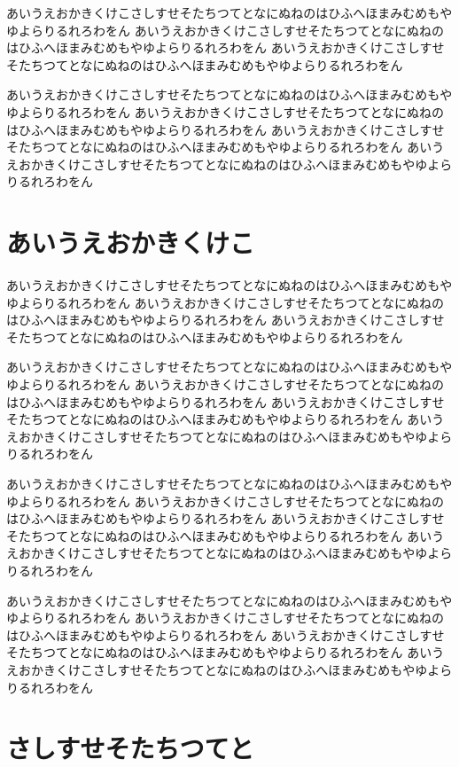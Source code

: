 \documentclass{jspf}            %
\begin{document}
あいうえおかきくけこさしすせそたちつてとなにぬねのはひふへほまみむめもやゆよらりるれろわをん
あいうえおかきくけこさしすせそたちつてとなにぬねのはひふへほまみむめもやゆよらりるれろわをん
あいうえおかきくけこさしすせそたちつてとなにぬねのはひふへほまみむめもやゆよらりるれろわをん

あいうえおかきくけこさしすせそたちつてとなにぬねのはひふへほまみむめもやゆよらりるれろわをん
あいうえおかきくけこさしすせそたちつてとなにぬねのはひふへほまみむめもやゆよらりるれろわをん
あいうえおかきくけこさしすせそたちつてとなにぬねのはひふへほまみむめもやゆよらりるれろわをん
あいうえおかきくけこさしすせそたちつてとなにぬねのはひふへほまみむめもやゆよらりるれろわをん

\section{あいうえおかきくけこ}

あいうえおかきくけこさしすせそたちつてとなにぬねのはひふへほまみむめもやゆよらりるれろわをん
あいうえおかきくけこさしすせそたちつてとなにぬねのはひふへほまみむめもやゆよらりるれろわをん
あいうえおかきくけこさしすせそたちつてとなにぬねのはひふへほまみむめもやゆよらりるれろわをん

あいうえおかきくけこさしすせそたちつてとなにぬねのはひふへほまみむめもやゆよらりるれろわをん
あいうえおかきくけこさしすせそたちつてとなにぬねのはひふへほまみむめもやゆよらりるれろわをん
あいうえおかきくけこさしすせそたちつてとなにぬねのはひふへほまみむめもやゆよらりるれろわをん
あいうえおかきくけこさしすせそたちつてとなにぬねのはひふへほまみむめもやゆよらりるれろわをん

あいうえおかきくけこさしすせそたちつてとなにぬねのはひふへほまみむめもやゆよらりるれろわをん
あいうえおかきくけこさしすせそたちつてとなにぬねのはひふへほまみむめもやゆよらりるれろわをん
あいうえおかきくけこさしすせそたちつてとなにぬねのはひふへほまみむめもやゆよらりるれろわをん
あいうえおかきくけこさしすせそたちつてとなにぬねのはひふへほまみむめもやゆよらりるれろわをん

あいうえおかきくけこさしすせそたちつてとなにぬねのはひふへほまみむめもやゆよらりるれろわをん
あいうえおかきくけこさしすせそたちつてとなにぬねのはひふへほまみむめもやゆよらりるれろわをん
あいうえおかきくけこさしすせそたちつてとなにぬねのはひふへほまみむめもやゆよらりるれろわをん
あいうえおかきくけこさしすせそたちつてとなにぬねのはひふへほまみむめもやゆよらりるれろわをん

\section{さしすせそたちつてと}
\end{document}
